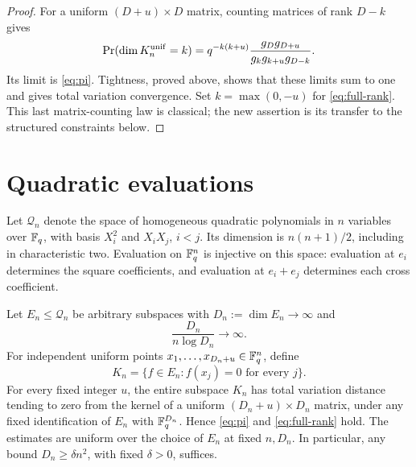 \begin{proof}
For a uniform $(D+u)\times D$ matrix, counting matrices of rank $D-k$
gives
\[
 \Pr(\dim K_n^{\rm unif}=k)
 =q^{-k(k+u)}\frac{g_Dg_{D+u}}{g_kg_{k+u}g_{D-k}}.
\]
Its limit is \eqref{eq:pi}. Tightness, proved above, shows that these
limits sum to one and gives total variation convergence. Set
$k=\max(0,-u)$ for \eqref{eq:full-rank}.
This last matrix-counting law is classical; the new assertion is its
transfer to the structured constraints below.
\end{proof}

\section{Quadratic evaluations}\label{sec:quadratics}

Let $\mathcal Q_n$ denote the space of homogeneous quadratic polynomials
in $n$ variables over $\mathbb F_q$, with basis $X_i^2$ and $X_iX_j$, $i<j$.
Its dimension is $n(n+1)/2$, including in characteristic two. Evaluation
on $\mathbb F_q^n$ is injective on this space: evaluation at $e_i$ determines
the square coefficients, and evaluation at $e_i+e_j$ determines each
cross coefficient.

\begin{theorem}\label{thm:quadratics}
Let $E_n\le\mathcal Q_n$ be arbitrary subspaces with
$D_n:=\dim E_n\to\infty$ and
\begin{equation}\label{eq:quadratic-size}
 \frac{D_n}{n\log D_n}\longrightarrow\infty.
\end{equation}
For independent uniform points
$x_1,\ldots,x_{D_n+u}\in\mathbb F_q^n$, define
\[
 K_n=\{f\in E_n:f(x_j)=0\text{ for every }j\}.
\]
For every fixed integer $u$, the entire subspace $K_n$ has total
variation distance tending to zero from the kernel of a uniform
$(D_n+u)\times D_n$ matrix, under any fixed identification of $E_n$
with $\mathbb F_q^{D_n}$. Hence \eqref{eq:pi} and \eqref{eq:full-rank} hold.
The estimates are uniform over the choice of $E_n$ at fixed $n,D_n$.
In particular, any bound $D_n\ge\delta n^2$, with fixed $\delta>0$,
suffices.
\end{theorem}

